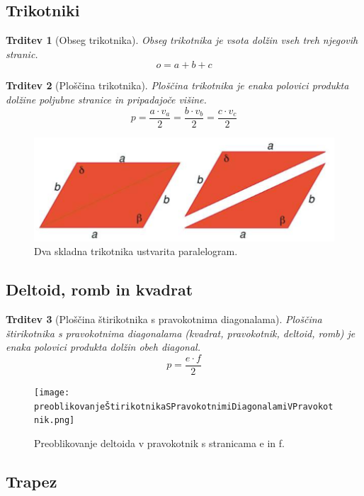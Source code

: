 \documentclass{article}
\newtheorem{trditev}{Trditev}[subsection]
\begin{document}
\pagebreak
\subsection{ Trikotniki }

\begin{trditev}[Obseg trikotnika]
    Obseg trikotnika je vsota dolžin vseh treh njegovih stranic.
    \[ o = a + b + c \]
\end{trditev}

\begin{trditev}[Ploščina trikotnika]
    Ploščina trikotnika je enaka polovici produkta dolžine poljubne stranice in pripadajoče višine.
    \[ p = \frac{a \cdot v_a}{2} = \frac{b \cdot v_b}{2} = \frac{c \cdot v_c}{2} \]
\end{trditev}

\begin{figure}[h]
    \includegraphics[width=\linewidth]{skladnaTrikotnikaParalelogram.png}
    \centering
    \caption{Dva skladna trikotnika ustvarita paralelogram.}
\end{figure}

\pagebreak
\subsection{ Deltoid, romb in kvadrat }

\begin{trditev}[Ploščina štirikotnika s pravokotnima diagonalama]
    Ploščina štirikotnika s pravokotnima diagonalama (kvadrat, pravokotnik, deltoid, romb) je enaka polovici produkta dolžin obeh diagonal.
    \[ p = \frac{e \cdot f}{2} \]
\end{trditev}


\begin{figure}[h]
    \texttt{[image: preoblikovanjeŠtirikotnikaSPravokotnimiDiagonalamiVPravokotnik.png]}
    \centering
    \caption{Preoblikovanje deltoida v pravokotnik s stranicama e in f.}
\end{figure}

\pagebreak
\subsection{ Trapez }
\end{document}
